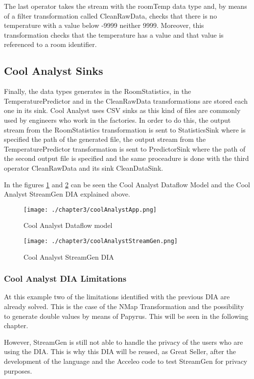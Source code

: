 The last operator takes the stream with the roomTemp data type and, by means of a filter transformation called CleanRawData, checks that there is no temperature with a value below -9999 neither 9999. Moreover, this transformation checks that the temperature has a value and that value is referenced to a room identifier.

\subsection{Cool Analyst Sinks}

Finally, the data types generates in the RoomStatistics, in the TemperaturePredictor and in the CleanRawData transformations are stored each one in its sink. Cool Analyst uses CSV sinks as this kind of files are commonly used by engineers who work in the factories. In order to do this, the output stream from the RoomStatistics transformation is sent to StatisticsSink where is specified the path of the generated file, the output stream from the TemperaturePredictor transformation is sent to PredictorSink where the path of the second output file is specified and the same proceadure is done with the third operator CleanRawData and its sink CleanDataSink.

In the figures \ref{fig:Cool Analyst Dataflow model} and \ref{fig:Cool Analyst StreamGen DIA} can be seen the Cool Analyst Dataflow Model and the Cool Analyst StreamGen DIA explained above.

\begin{figure}
\centering
{\texttt{[image: ./chapter3/coolAnalystApp.png]}}
\caption{Cool Analyst Dataflow model}
\label{fig:Cool Analyst Dataflow model}
\end{figure}

\begin{figure}
\centering
{\texttt{[image: ./chapter3/coolAnalystStreamGen.png]}}
\caption{Cool Analyst StreamGen DIA}
\label{fig:Cool Analyst StreamGen DIA}
\end{figure}

\subsubsection*{Cool Analyst DIA Limitations}

At this example two of the limitations identified with the previous DIA are already solved. This is the case of the NMap Transformation and the possibility to generate double values by means of Papyrus. This will be seen in the following chapter.

However, StreamGen is still not able to handle the privacy of the users who are using the DIA. This is why this DIA will be reused, as Great Seller, after the development of the language and the Acceleo code to test StreamGen for privacy purposes.

